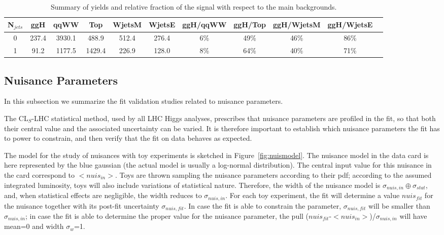 \begin{table}
\begin{center}
\begin{tabular}{c | c c c c c | c  c  c c c }
\hline
N$_{jets}$ & ggH & qqWW & Top & WjetsM & WjetsE & ggH/qqWW & ggH/Top & ggH/WjetsM & ggH/WjetsE \\
\hline
0 & 237.4 & 3930.1 & 488.9  & 512.4 & 276.4 & 6\% & 49\% & 46\% &  86\%\\
1 & 91.2  & 1177.5 & 1429.4 & 226.9 & 128.0 & 8\% & 64\% & 40\% &  71\%\\
\hline
\end{tabular}
\caption{Summary of yields and relative fraction of the signal with respect to the main backgrounds.}
\label{tab:yield_summary}
\end{center}
\end{table}

\subsection{Nuisance Parameters}

In this subsection we summarize the fit validation studies related to nuisance parameters.

The CL$_S$-LHC statistical method, used by all LHC Higgs analyses, prescribes that nuisance parameters are profiled in the fit, 
so that both their central value and the associated uncertainty can be varied. %
It is therefore important to establish which nuisance parameters the fit has to power to constrain, and then verify that the fit 
on data behaves as expected.

The model for the study of nuisances with toy experiments is sketched in Figure~\ref{fig:nuismodel}.
The nuisance model in the data card is here represented by the blue gaussian (the actual model is usually a log-normal distribution).
The central input value for this nuisance in the card correspond to $<$$nuis_{in}$$>$. 
Toys are thrown sampling the nuisance parameters according to their pdf; according to the assumed integrated luminosity, 
toys will also include variations of statistical nature. 
Therefore, the width of the nuisance model is $\sigma_{nuis,in} \oplus \sigma_{stat}$, and, when statistical effects are negligible, 
the width reduces to $\sigma_{nuis,in}$. 
For each toy experiment, the fit will determine a value $nuis_{fit}$ for the nuisance together with its post-fit uncertainty $\sigma_{nuis,fit}$.
In case the fit is able to constrain the parameter, $\sigma_{nuis,fit}$ will be smaller than $\sigma_{nuis,in}$; in case the fit is able to
determine the proper value for the nuisance parameter, the pull ($nuis_{fit}$-$<$$nuis_{in}$$>$)/$\sigma_{nuis,in}$ will have mean=0 and width $\sigma_w$=1.

